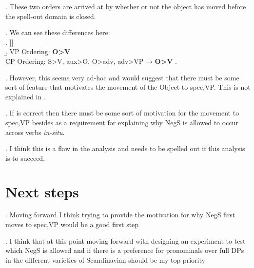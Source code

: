 \documentclass[12pt, letterpaper]{article}
\begin{document}
\ex. These two orders are arrived at by whether or not the object has moved before the spell-out domain is closed. 

\ex. We can see these differences here:\\
\a.
\I[CP S aux … \I[NegP \rnode{A1}O adv \I[VP \rnode{A2}t\textsubscript{o}  V \rnode{A3}t\textsubscript{o} ]]]
\\
\b. VP Ordering: \textbf{O>V}\\
CP Ordering: S>V, aux>O, O>adv, adv>VP → \textbf{O>V}
\z.

\ex. However, this seems very ad-hoc and would suggest that there must be some sort of feature that motivates the movement of the Object to spec,VP. This is not explained in \citet{engelsScandinavianNegativeIndefinites2012}. 

\ex. If \citet{engelsScandinavianNegativeIndefinites2012} is correct then there must be some sort of motivation for the movement to spec,VP besides as a requirement for explaining why NegS is allowed to occur across verbs \textit{in-situ}.

\ex. I think this is a flaw in the analysis and needs to be spelled out if this analysis is to succeed.


\section{Next steps}

\ex. Moving forward I think trying to provide the motivation for why NegS first moves to spec,VP would be a good first step

\ex. I think that at this point moving forward with designing an experiment to test which NegS is allowed and if there is a preference for pronominals over full DPs in the different varieties of Scandinavian should be my top priority
 


\printbibliography

\end{document}
